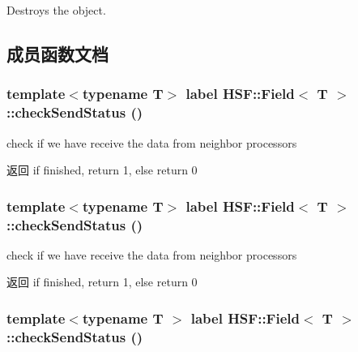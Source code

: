 Destroys the object. 

\subsection{成员函数文档}
\hypertarget{classHSF_1_1Field_a11428b9621735dae6b01939a480295a3}{
\subsubsection[{checkSendStatus}]{\setlength{\rightskip}{0pt plus 5cm}template$<$typename T$>$ label {\bf HSF::Field}$<$ T $>$::checkSendStatus ()}}
\label{classHSF_1_1Field_a11428b9621735dae6b01939a480295a3}


check if we have receive the data from neighbor processors \begin{DoxyReturn}{返回}
if finished, return 1, else return 0 
\end{DoxyReturn}
\hypertarget{classHSF_1_1Field_a11428b9621735dae6b01939a480295a3}{
\subsubsection[{checkSendStatus}]{\setlength{\rightskip}{0pt plus 5cm}template$<$typename T$>$ label {\bf HSF::Field}$<$ T $>$::checkSendStatus ()}}
\label{classHSF_1_1Field_a11428b9621735dae6b01939a480295a3}


check if we have receive the data from neighbor processors \begin{DoxyReturn}{返回}
if finished, return 1, else return 0 
\end{DoxyReturn}
\hypertarget{classHSF_1_1Field_a11428b9621735dae6b01939a480295a3}{
\subsubsection[{checkSendStatus}]{\setlength{\rightskip}{0pt plus 5cm}template$<$typename T $>$ label {\bf HSF::Field}$<$ T $>$::checkSendStatus ()}}
\label{classHSF_1_1Field_a11428b9621735dae6b01939a480295a3}


